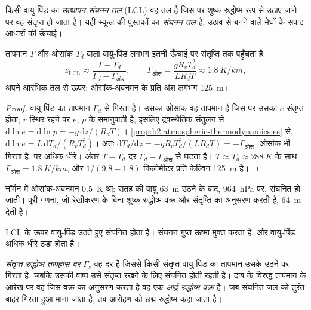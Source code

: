 \begin{definition}[उत्थापन संघनन तल]\label{def:b2:atmospheric-thermodynamics:lcl}
किसी वायु-पिंड का \emph{उत्थापन संघनन तल} (LCL) वह
तल है जिस पर शुष्क-रुद्धोष्म रूप से उठाए जाने पर वह संतृप्त हो जाता है। यही स्कूल की पुस्तकों का
\emph{संघनन तल} है, उठाव से बनने वाले मेघों के
सपाट आधारों की ऊँचाई।
\end{definition}

\begin{proposition}[उत्थापन संघनन तल की ऊँचाई]\label{prop:b2:atmospheric-thermodynamics:lcl}
तापमान $T$ और ओसांक $T_d$ वाला वायु-पिंड लगभग इतनी ऊँचाई पर संतृप्ति तक पहुँचता है:
\[
  z_{\text{LCL}} \approx \frac{T - T_d}{\Gamma_d - \Gamma_{\text{ओस}}}, \qquad
  \Gamma_{\text{ओस}} = \frac{g R_v T_d^2}{L R_d T} \approx \qty{1.8}{K/km},
\]
अपने आरंभिक तल से ऊपर: ओसांक-अवनमन के प्रति अंश लगभग \qty{125}{m}।
\end{proposition}

\begin{proof}
वायु-पिंड का तापमान $\Gamma_d$ से गिरता है। उसका ओसांक वह तापमान है जिस पर उसका
 $e$ संतृप्त होता; $r$ स्थिर रहने पर $e$, $p$ के समानुपाती है, इसलिए
द्रवस्थैतिक संतुलन से $\mathrm{d}\ln e = \mathrm{d}\ln p = -g\,\mathrm{d}z/(R_dT)$।
\cref{prop:b2:atmospheric-thermodynamics:es} से, $\mathrm{d}\ln e = L\,\mathrm{d}T_d/(R_vT_d^2)$।
अतः $\mathrm{d}T_d/\mathrm{d}z = -gR_vT_d^2/(LR_dT) = -\Gamma_{\text{ओस}}$: ओसांक भी गिरता है,
पर अधिक धीरे। अंतर $T - T_d$ दर $\Gamma_d - \Gamma_{\text{ओस}}$ से घटता है।
$T \approx T_d \approx \qty{288}{K}$ के साथ $\Gamma_{\text{ओस}} = \qty{1.8}{K/km}$, और $1/(9.8 - 1.8)$
किलोमीटर प्रति केल्विन \qty{125}{m} है।
\end{proof}

नॉर्मन में ओसांक-अवनमन \qty{0.5}{K} था: सतह की वायु
\qty{63}{m} उठने के बाद, \qty{964}{hPa} पर, संघनित हो जाती। पूरी गणना, जो रेखीकरण के बिना शुष्क रुद्धोष्म वक्र और
संतृप्ति  का अनुसरण करती है, \qty{64}{m} देती है।

LCL के ऊपर वायु-पिंड उठते हुए संघनित होता है। संघनन गुप्त ऊष्मा मुक्त करता है, और वायु-पिंड
अधिक धीरे ठंडा होता है।

\begin{definition}[संतृप्त रुद्धोष्म तापह्रास दर; आर्द्र रुद्धोष्म वक्र]\label{def:b2:atmospheric-thermodynamics:moist-adiabat}
\emph{संतृप्त रुद्धोष्म तापह्रास दर} $\Gamma_s$
वह दर है जिससे किसी संतृप्त वायु-पिंड का तापमान उसके उठने पर गिरता है, जबकि उसकी वाष्प उसे संतृप्त रखने के लिए
संघनित होती रहती है। दाब के विरुद्ध तापमान के आरेख पर वह जिस वक्र का अनुसरण करता है वह एक
\emph{आर्द्र रुद्धोष्म वक्र} है। जब संघनित जल को तुरंत बाहर गिरता हुआ
माना जाता है, तब आरोहण को छद्म-रुद्धोष्म कहा जाता है।
\end{definition}

